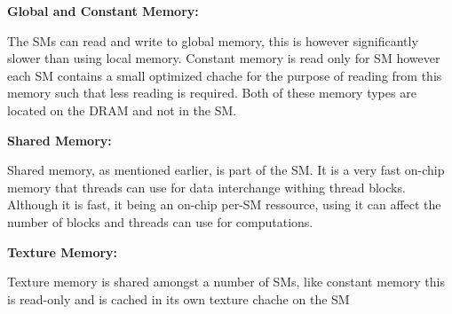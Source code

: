 \textbf{Global and Constant Memory:}

The SMs can read and write to global memory, this is however significantly slower than using local memory. %
Constant memory is read only for SM however each SM contains a small optimized chache for the purpose of reading from this memory such that less reading is required. Both of these memory types are located on the DRAM and not in the SM.

\textbf{Shared Memory:}

Shared memory, as mentioned earlier, is part of the SM.
It is a very fast on-chip memory that threads can use for data interchange withing thread blocks.
Although it is fast, it being an on-chip per-SM ressource, using it can affect the number of blocks and threads can use for computations.

\textbf{Texture Memory:}

Texture memory is shared amongst a number of SMs, like constant memory this is read-only and is cached in its own texture chache on the SM

